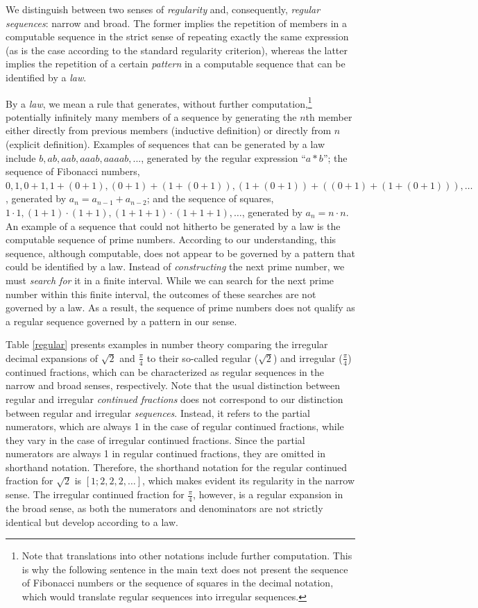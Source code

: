 \documentclass[%
  manuscript=article,   %
  year=2024,
  volume=77,
  doi=00000.000,
]{zfn}
\begin{document}
We distinguish between two senses of \emph{regularity} and, consequently, \emph{regular sequences}: narrow and broad. The former implies the repetition of members in a computable sequence in the strict sense of repeating exactly the same expression (as is the case according to the standard regularity criterion), whereas the latter implies the repetition of a certain \emph{pattern} in a computable sequence that can be identified by a \textit{law}.

By a \textit{law}, we mean a rule that generates, without further computation,\footnote{Note that translations into other notations include further computation. This is why the following sentence in the main text does not present the sequence of Fibonacci numbers or the sequence of squares in the decimal notation, which would translate regular sequences into irregular sequences.} potentially infinitely many members of a sequence by generating the $n$th member either directly from previous members (inductive definition) or directly from $n$ (explicit definition).
Examples of sequences that can be generated by a law include $b,ab,aab,aaab,aaaab,...$, generated by the regular expression ``$a*b$''; the sequence of Fibonacci numbers, $0,1,0+1,1+(0+1),(0+1)+(1+(0+1)),(1+(0+1))+((0+1)+(1+(0+1))),\ldots$, generated by $a_{n} = a_{n-1}+a_{n-2}$; and the sequence of squares, $1\cdot 1,(1+1)\cdot(1+1),(1+1+1)\cdot(1+1+1), \ldots$, generated by $a_{n} = n\cdot n$. An example of a sequence that could not hitherto be generated by a law is the computable sequence of prime numbers. According to our understanding, this sequence, although computable, does not appear to be governed by a pattern that could be identified by a law. Instead of \textit{constructing} the next prime number, we must \textit{search for} it in a finite interval. While we can search for the next prime number within this finite interval, the outcomes of these searches are not governed by a law. As a result, the sequence of prime numbers does not %
qualify as a regular sequence governed by a pattern in our sense.


Table \ref{regular} presents examples in number theory comparing the irregular decimal expansions of $\sqrt{2}$ and $\frac{\pi}{4}$ to their so-called regular ($\sqrt{2}$) and irregular ($\frac{\pi}{4}$) continued fractions, which can be characterized as regular sequences in the narrow and broad senses, respectively.
Note that the usual distinction between regular and irregular \emph{continued fractions} does not correspond to our distinction between regular and irregular \emph{sequences}. Instead, it refers to the partial numerators, which are always 1 in the case of regular continued fractions, while they vary in the case of irregular continued fractions.
Since the partial numerators are always 1 in regular continued fractions,
they are omitted in shorthand notation. Therefore, the shorthand notation for the regular continued fraction for $\sqrt{2}$ is $[1;2,2,2, \ldots]$, which makes evident its regularity in the narrow sense. The irregular continued fraction for $\frac{\pi}{4}$, however, is a regular expansion in the broad sense, as both the numerators and denominators are not strictly identical but develop according to a law.
\end{document}

